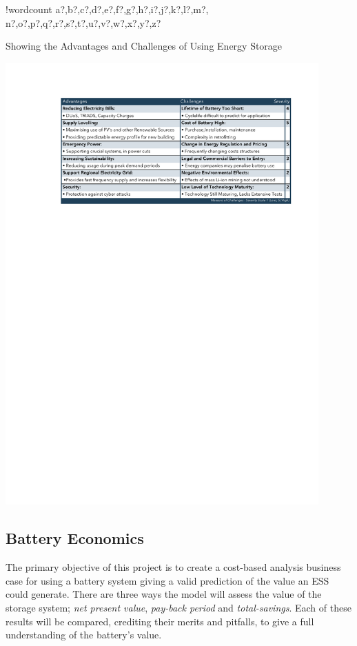 \documentclass[fontsize=9.5pt]{extarticle}
\numberwithin{figure}{section} %
\newcounter{words}
\newenvironment{counted}{%
  \setcounter{words}{0}
  \SearchList!{wordcount}{\stepcounter{words}}
    {a?,b?,c?,d?,e?,f?,g?,h?,i?,j?,k?,l?,m?,
    n?,o?,p?,q?,r?,s?,t?,u?,v?,w?,x?,y?,z?}
  \UndoBoundary{'}
  \SearchOrder{p;}}{%
  \StopSearching}
\begin{document}
\begin{counted}
\begin{table}[H]
\vspace{-10pt}
\caption{Showing the Advantages and Challenges of Using Energy Storage}
\vspace{-5pt}
\centering
\includegraphics[trim = 0 0 0 0, clip, width=0.9\textwidth]{AdvantChallTab.pdf}
\label{AdChalltab}
\vspace{-15pt}
\end{table}

\subsection{Battery Economics}\label{battery-economics}

The primary objective of this project is to create a cost-based analysis
business case for using a battery system giving a valid prediction of
the value an ESS could generate. There are three ways the model will
assess the value of the storage system; \emph{net present value},
\emph{pay-back period} and \emph{total-savings}. Each of these results
will be compared, crediting their merits and pitfalls, to give a full
understanding of the battery's value.


\end{counted}
\end{document}
